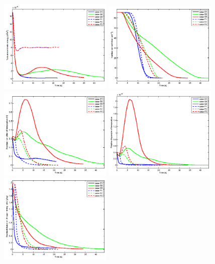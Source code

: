 \begin{figure}\centering \includegraphics[width=0.48\textwidth]{Figures/tke}
\includegraphics[width=0.48\textwidth]{Figures/num_con}\\
\includegraphics[width=0.48\textwidth]{Figures/temp_std}
\includegraphics[width=0.48\textwidth]{Figures/temp_dsp}\\
\includegraphics[width=0.48\textwidth]{Figures/vapor_std}

\end{figure}
